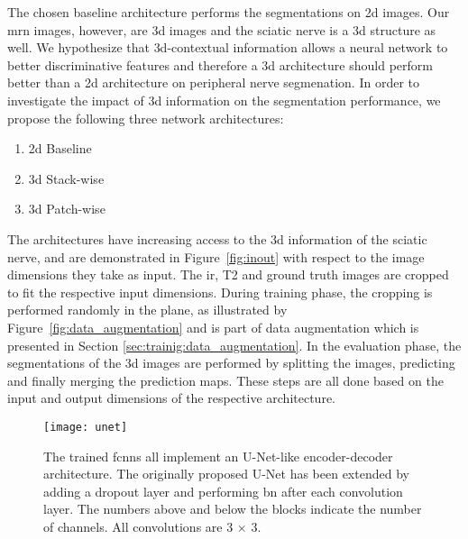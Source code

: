 The chosen baseline architecture performs the segmentations on \gls{2d} images. Our \gls{mrn} images, however, are \gls{3d} images and the sciatic nerve is a \gls{3d} structure as well. We hypothesize that \gls{3d}-contextual information allows a neural network to better discriminative features and therefore a \gls{3d} architecture should perform better than a \gls{2d} architecture on peripheral nerve segmenation. In order to investigate the impact of \gls{3d} information on the segmentation performance, we propose the following three network architectures:
\begin{enumerate}
  \item \gls{2d} Baseline
  \item \gls{3d} Stack-wise
  \item \gls{3d} Patch-wise
\end{enumerate}
The architectures have increasing access to the \gls{3d} information of the sciatic nerve, and are demonstrated in Figure~\ref{fig:inout} with respect to the image dimensions they take as input. The \gls{ir}, T2 and ground truth images are cropped to fit the respective input dimensions. During training phase, the cropping is performed randomly in the plane, as illustrated by Figure~\ref{fig:data_augmentation} and is part of data augmentation which is presented in Section \ref{sec:trainig:data_augmentation}. In the evaluation phase, the segmentations of the \gls{3d} images are performed by splitting the images, predicting and finally merging the prediction maps. These steps are all done based on the input and output dimensions of the respective architecture.

\begin{figure}[htbp]	
	\texttt{[image: unet]}
    \caption[Network Architecture]{The trained \gls{fcnn}s all implement an U-Net-like encoder-decoder architecture. The originally proposed U-Net has been extended by adding a dropout layer and performing \gls{bn} after each convolution layer. The numbers above and below the blocks indicate the number of channels. All convolutions are 3 $\times$ 3.}
    \label{fig:unet}
\end{figure}

